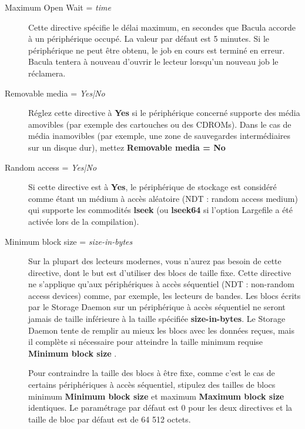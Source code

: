 \begin{description}
\item [Maximum Open Wait = {\it time}]
   Cette directive sp\'ecifie le d\'elai maximum, en secondes que Bacula 
   accorde \`a un p\'eriph\'erique occup\'e. La valeur par d\'efaut est 5 minutes. 
   Si le p\'eriph\'erique ne peut \^etre obtenu, le job en cours est termin\'e en erreur. 
   Bacula tentera \`a nouveau d'ouvrir le lecteur lorsqu'un nouveau job le 
   r\'eclamera.

\item [Removable media = {\it Yes|No}]
   R\'eglez cette directive \`a {\bf Yes} si le p\'eriph\'erique concern\'e supporte des 
   m\'edia amovibles (par exemple des cartouches ou des CDROMs). Dans le cas de 
   m\'edia inamovibles (par exemple, une zone de sauvegardes interm\'ediaires sur un 
   disque dur), mettez {\bf Removable media = No}

\item [Random access = {\it Yes|No}]
   Si cette directive est \`a {\bf Yes}, le p\'eriph\'erique de stockage est consid\'er\'e 
   comme \'etant un m\'edium \`a acc\`es al\'eatoire (NDT : random access medium) qui 
   supporte les commodit\'es {\bf lseek} (ou {\bf lseek64} si l'option Largefile 
   a \'et\'e activ\'ee lors de la compilation).
   
\item [Minimum block size = {\it size-in-bytes}]
  Sur la plupart des lecteurs modernes, vous n'aurez pas besoin de cette 
  directive, dont le but est d'utiliser des blocs de taille fixe. Cette 
  directive ne s'applique qu'aux p\'eriph\'eriques \`a acc\`es s\'equentiel (NDT : 
  non-random access devices) comme, par exemple, les lecteurs de bandes. 
  Les blocs \'ecrits par le Storage Daemon sur un p\'eriph\'erique \`a acc\`es 
  s\'equentiel ne seront jamais de taille inf\'erieure \`a la taille sp\'ecifi\'ee 
  {\bf size-in-bytes}. Le Storage Daemon tente de remplir au mieux les blocs 
  avec les donn\'ees re\c {c}ues, mais il compl\`ete si n\'ecessaire pour atteindre 
  la taille minimum requise {\bf Minimum block size} .

  Pour contraindre la taille des blocs \`a \^etre fixe, comme c'est le cas de 
  certains p\'eriph\'eriques \`a acc\`es s\'equentiel, stipulez des tailles de blocs 
  minimum {\bf Minimum block size} et maximum {\bf Maximum block size} 
  identiques. Le param\'etrage par d\'efaut est 0 pour les deux directives 
  et la taille de bloc par d\'efaut est de 64 512 octets. 
 

\end{description}
